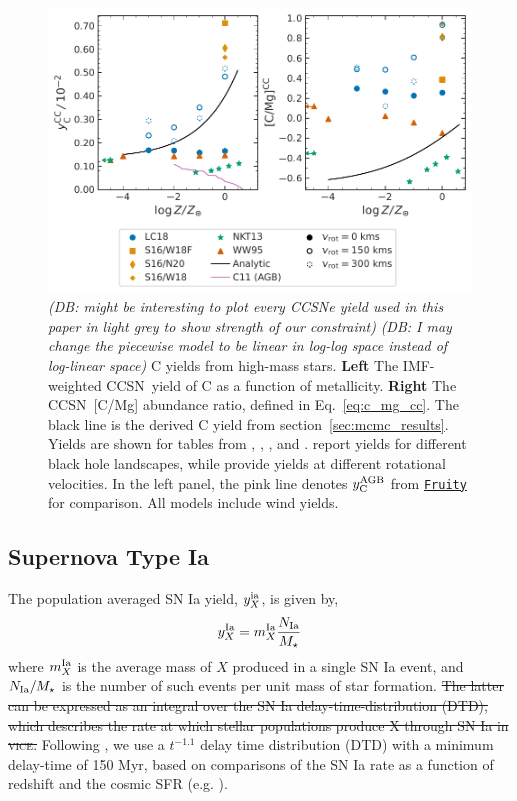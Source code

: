 \documentclass[fleqn,
referee, %
usenatbib]{mnras}
\newcommand{\VICE}{\textsc{vice}}
\newcommand{\fruity}{\texttt{\hyperlink{fruity}{Fruity}}}
\newcommand{\cc}{CCSN}
\newcommand{\Ycagb}{{y_{\rm C}^{\rm AGB}}}
\newcommand{\dbstrike}[1]{{\color{Thistle} \sout{#1} }}
\newcommand{\dbnote}[1]{ {\color{Thistle} \textit{\small (DB: #1)}} }
\begin{document}
\begin{figure}
    \centering
    \includegraphics{cc_yields.pdf}
    \caption[]{
    \dbnote{might be interesting to plot every CCSNe yield used in this paper in light grey to show strength of our constraint}
    \dbnote{I may change the piecewise model to be linear in log-log space instead of log-linear space}
        C yields from high-mass stars.
        \textbf{Left} The IMF-weighted \cc\ yield of C as a function of metallicity.
        \textbf{Right} The \cc\ [C/Mg] abundance ratio, defined in Eq.~\ref{eq:c_mg_cc}. The black line is the derived C yield from section~\ref{sec:mcmc_results}. Yields are shown for tables from 
    \citet[red triangles]{WW95}, \citet[orange square and diamond]{sukhbold+16}, 
    \citet[green stars]{NKT13}, and \citet[blue circles]{LC18}. \citet{sukhbold+16} report yields for different black hole landscapes, while \citet{LC18} provide yields at different rotational velocities.
    In the left panel, the pink line denotes $\Ycagb$ from \fruity{} for comparison. All models include wind yields. 
}
    \label{fig:y_cc}
\end{figure}


\subsection{Supernova Type Ia}
The population averaged SN Ia yield, $y_{X}^{\rm ia}$, is given by,
\begin{equation}
    y_{X}^{\rm Ia} = m_{X}^{\rm Ia} \frac{N_{\rm Ia}}{M_\star}
\end{equation}
where $m_{X}^{\rm Ia}$ is the average mass of $X$ produced in a single SN Ia event, and $N_{\rm Ia} / M_\star$ is the number of such events per unit mass of star formation. \dbstrike{The latter can be expressed as an integral over the SN Ia delay-time-distribution (DTD), which describes the rate at which stellar populations produce X through SN Ia in \VICE.} Following \citet{james+23}, we use a $t^{-1.1}$  delay time distribution (DTD) with a minimum delay-time of 150 Myr, based on comparisons of the SN Ia rate as a function of redshift and the cosmic SFR (e.g. \citealt{maoz+mannucci12}). 
\end{document}
